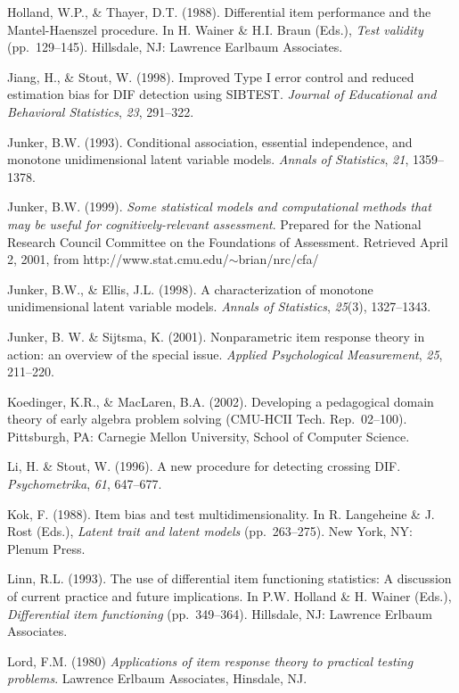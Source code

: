 \documentclass[titlepage,11pt,twoside]{article}
\begin{document}
\begin{thebibliography}
\bibitem Holland, W.P., \& Thayer, D.T. (1988). Differential item performance and the Mantel-Haenszel procedure. In H. Wainer \& H.I. Braun (Eds.), \textit{Test validity} (pp.~129--145). Hillsdale, NJ: Lawrence Earlbaum Associates.

\bibitem Jiang, H., \& Stout, W. (1998). Improved Type I error control and reduced estimation bias for DIF detection using SIBTEST. \textit{Journal of Educational and Behavioral Statistics}, \textit{23}, 291--322.

\bibitem Junker, B.W. (1993). Conditional association, essential independence, and monotone unidimensional latent variable models. \textit{Annals of Statistics}, \textit{21}, 1359--1378.

\bibitem Junker, B.W. (1999). \textit{Some statistical models and computational methods that may be useful for cognitively-relevant assessment}. Prepared for the National Research Council Committee on the Foundations of Assessment. Retrieved April 2, 2001, from \mbox{http://www.stat.cmu.edu/$\sim $brian/nrc/cfa/}

\bibitem Junker, B.W., \& Ellis, J.L. (1998). A characterization of monotone unidimensional latent variable models. \textit{Annals of Statistics}, \textit{25}(3), 1327--1343.

\bibitem Junker, B. W. \& Sijtsma, K. (2001). Nonparametric item response theory in action: an overview of the special issue. \textit{Applied Psychological Measurement}, \textit{25}, 211--220.

\bibitem Koedinger, K.R., \& MacLaren, B.A. (2002). Developing a pedagogical domain theory of early algebra problem solving (CMU-HCII Tech. Rep.~02--100). Pittsburgh, PA: Carnegie Mellon University, School of Computer Science.

\bibitem Li, H. \& Stout, W. (1996). A new procedure for detecting crossing DIF. \textit{Psychometrika}, \textit{61}, 647--677.

\bibitem Kok, F. (1988). Item bias and test multidimensionality. In R. Langeheine \& J. Rost (Eds.), \textit{Latent trait and latent models} (pp.~263--275). New York, NY: Plenum Press.

\bibitem Linn, R.L. (1993). The use of differential item functioning statistics: A discussion of current practice and future implications. In P.W. Holland \& H. Wainer (Eds.), \textit{Differential item functioning} (pp.~349--364). Hillsdale, NJ: Lawrence Erlbaum Associates.


\bibitem Lord, F.M. (1980) \textit{Applications of item response theory to practical testing problems}. Lawrence Erlbaum Associates, Hinsdale, NJ.


\end{thebibliography}
\end{document}

